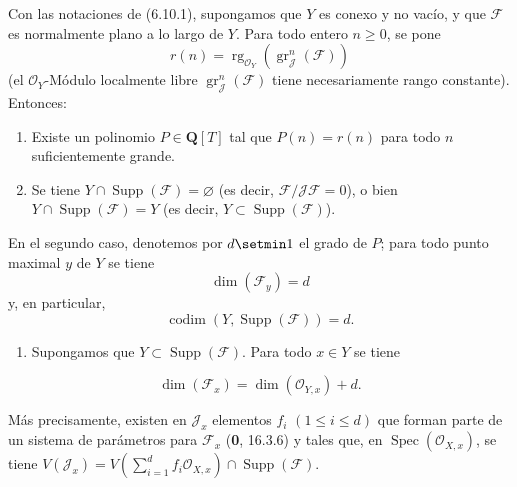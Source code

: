 \begin{proposition}[6.10.5]
\label{IV.2.s6.10.5-fr}
Con las notaciones de \textup{(6.10.1)}, supongamos que $Y$ es conexo y no
vacío, y que $\mathcal F$ es normalmente plano a lo largo de $Y$. Para todo
entero $n\geq0$, se pone
\begin{equation}
r(n)=\operatorname{rg}_{\mathcal O_Y}
(\operatorname{gr}_{\mathcal J}^{n}(\mathcal F))
\tag{6.10.5.1}\label{IV.2.s6.10.5.1-fr}
\end{equation}
(el $\mathcal O_Y$-Módulo localmente libre
$\operatorname{gr}_{\mathcal J}^{n}(\mathcal F)$ tiene necesariamente rango
constante). Entonces:
\begin{enumerate}
\item[\textup{(i)}] Existe un polinomio $P\in\mathbf Q[T]$ tal que $P(n)=r(n)$ para
todo $n$ suficientemente grande.
\item[\textup{(ii)}] Se tiene $Y\cap\operatorname{Supp}(\mathcal F)=\varnothing$
(es decir, $\mathcal F/\mathcal J\mathcal F=0$), o bien
$Y\cap\operatorname{Supp}(\mathcal F)=Y$ (es decir,
$Y\subset\operatorname{Supp}(\mathcal F)$).
\end{enumerate}
En el segundo caso, denotemos por $d\setmin 1$ el grado de $P$; para todo punto maximal $y$
de $Y$ se tiene
\begin{equation}
\dim(\mathcal F_y)=d
\tag{6.10.5.2}\label{IV.2.s6.10.5.2-fr}
\end{equation}
y, en particular,
\begin{equation}
\operatorname{codim}(Y,\operatorname{Supp}(\mathcal F))=d.
\tag{6.10.5.3}\label{IV.2.s6.10.5.3-fr}
\end{equation}
\begin{enumerate}
\item[\textup{(iii)}] Supongamos que $Y\subset\operatorname{Supp}(\mathcal F)$. Para todo
$x\in Y$ se tiene
\end{enumerate}
\begin{equation}
\dim(\mathcal F_x)=\dim(\mathcal O_{Y,x})+d.
\tag{6.10.5.4}\label{IV.2.s6.10.5.4-fr}
\end{equation}

Más precisamente, existen en $\mathcal J_x$ elementos $f_i$
$(1\leq i\leq d)$ que forman parte de un sistema de parámetros para
$\mathcal F_x$ \textup{(\textbf{0}, 16.3.6)} y tales que, en
$\operatorname{Spec}(\mathcal O_{X,x})$, se tiene
$V(\mathcal J_x)=V(\sum_{i=1}^{d}f_i\mathcal O_{X,x})\cap\operatorname{Supp}(\mathcal F)$.
\end{proposition}

